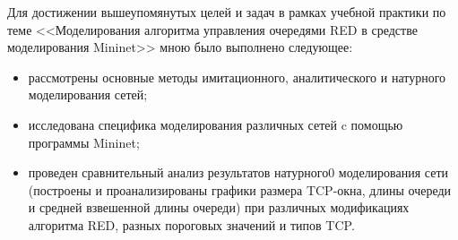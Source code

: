 Для достижении вышеупомянутых целей и задач в рамках учебной практики
по теме <<Моделирования алгоритма управления очередями RED в средстве
моделирования Mininet>> мною было выполнено следующее:
\begin{itemize}
\item рассмотрены основные методы имитационного, аналитического и
  натурного моделирования сетей;
\item исследована специфика моделирования различных сетей c помощью
  программы Mininet;
\item проведен сравнительный анализ результатов натурного0
  моделирования сети (построены и проанализированы графики размера
  TCP-окна, длины очереди и средней взвешенной длины очереди) при
  различных модификациях алгоритма RED, разных пороговых значений и
  типов TCP.
\end{itemize}
